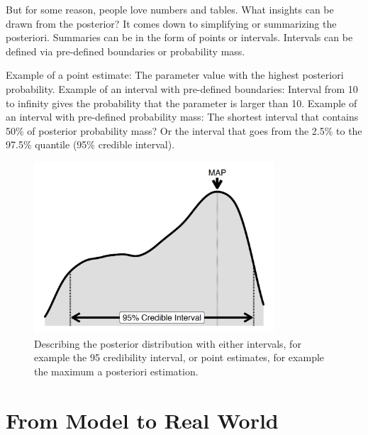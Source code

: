 \documentclass[
  10pt,
]{scrbook}
\begin{document}
But for some reason, people love numbers and tables.
What insights can be drawn from the posterior?
It comes down to simplifying or summarizing the posteriori.
Summaries can be in the form of points or intervals.
Intervals can be defined via pre-defined boundaries or probability mass.

Example of a point estimate: The parameter value with the highest posteriori probability.
Example of an interval with pre-defined boundaries: Interval from 10 to infinity gives the probability that the parameter is larger than 10.
Example of an interval with pre-defined probability mass: The shortest interval that contains 50\% of posterior probability mass? Or the interval that goes from the 2.5\% to the 97.5\% quantile (95\% credible interval).

\begin{figure}

{\centering \includegraphics[width=0.8\textwidth]{figures/posteriori-1} 

}

\caption{Describing the posterior distribution with either intervals, for example the 95 credibility interval, or point estimates, for example the maximum a posteriori estimation.}\label{fig:posteriori}
\end{figure}

\hypertarget{from-model-to-real-world}{%
\section{From Model to Real World}\label{from-model-to-real-world}}
\end{document}
